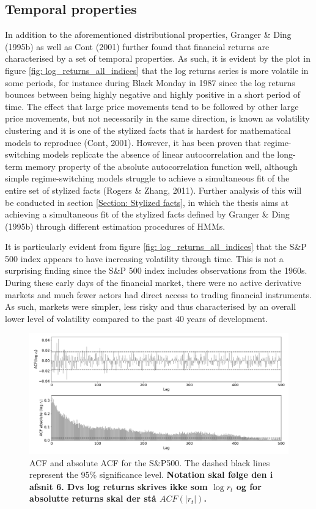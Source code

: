 \subsection{Temporal properties}
\label{subsection: temporal properties}
In addition to the aforementioned distributional properties, Granger \& Ding (1995b) as well as Cont (2001) further found that financial returns are characterised by a set of temporal properties. As such, it is evident by the plot in figure \ref{fig: log_returns_all_indices} that the log returns series is more volatile in some periods, for instance during Black Monday in 1987 since the log returns bounces between being highly negative and highly positive in a short period of time. The effect that large price movements tend to be followed by other large price movements, but not necessarily in the same direction, is known as volatility clustering and it is one of the stylized facts that is hardest for mathematical models to reproduce (Cont, 2001). However, it has been proven that regime-switching models replicate the absence of linear autocorrelation and the long-term memory property of the absolute autocorrelation function well, although simple regime-switching models struggle to achieve a simultaneous fit of the entire set of stylized facts (Rogers \& Zhang, 2011). Further analysis of this will be conducted in section \ref{Section: Stylized facts}, in which the thesis aims at achieving a simultaneous fit of the stylized facts defined by Granger \& Ding (1995b) through different estimation procedures of HMMs.

It is particularly evident from figure \ref{fig: log_returns_all_indices} that the S\&P 500 index appears to have increasing volatility through time. This is not a surprising finding since the S\&P 500 index includes observations from the 1960s. During these early days of the financial market, there were no active derivative markets and much fewer actors had direct access to trading financial instruments. As such, markets were simpler, less risky and thus characterised by an overall lower level of volatility compared to the past 40 years of development.

\begin{figure}[H] 
    \centering
    \includegraphics[width=1\textwidth]{analysis/data_description/images/SP500_ACF.png}
    \caption[ACF and absolute ACF for the S\&P500]{ACF and absolute ACF for the S\&P500. The dashed black lines represent the 95\% significance level. \textbf{Notation skal følge den i afsnit 6. Dvs log returns skrives ikke som $\log r_t$ og for absolutte returns skal der stå $ACF(|r_t|)$.}}
    \label{fig: ACF_all_log_returns}
\end{figure}

